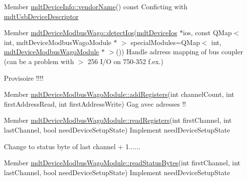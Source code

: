 \begin{DoxyDescription}
\item[Member \hyperlink{classmdt_device_info_a207d7b6b49fd65726232e95cd9e0568c}{mdtDeviceInfo::vendorName}() const  ]Conficting with \hyperlink{classmdt_usb_device_descriptor}{mdtUsbDeviceDescriptor} 
\end{DoxyDescription}

\label{todo__todo000006}
\hypertarget{todo__todo000006}{}
 
\begin{DoxyDescription}
\item[Member \hyperlink{classmdt_device_modbus_wago_af26af790e502e5b85498540dd215cff7}{mdtDeviceModbusWago::detectIos}(\hyperlink{classmdt_device_ios}{mdtDeviceIos} $\ast$ios, const QMap$<$ int, mdtDeviceModbusWagoModule $\ast$ $>$ specialModules=QMap$<$ int, \hyperlink{classmdt_device_modbus_wago_module}{mdtDeviceModbusWagoModule} $\ast$ $>$()) ]Handle adrress mapping of bus coupler (can be a problem with $>$ 256 I/O on 750-\/352 f.ex.) 

Provisoire !!!! 
\end{DoxyDescription}

\label{todo__todo000009}
\hypertarget{todo__todo000009}{}
 
\begin{DoxyDescription}
\item[Member \hyperlink{classmdt_device_modbus_wago_module_ad803f3aa8d9777feaa5cdb3a4cccd316}{mdtDeviceModbusWagoModule::addRegisters}(int channelCount, int firstAddressRead, int firstAddressWrite) ]Gag avec adresses !! 
\end{DoxyDescription}

\label{todo__todo000010}
\hypertarget{todo__todo000010}{}
 
\begin{DoxyDescription}
\item[Member \hyperlink{classmdt_device_modbus_wago_module_aa775cffab72f7ed7cd92a48d26da3225}{mdtDeviceModbusWagoModule::readRegisters}(int firstChannel, int lastChannel, bool needDeviceSetupState) ]Implement needDeviceSetupState 

Change to status byte of last channel + 1...... 
\end{DoxyDescription}

\label{todo__todo000013}
\hypertarget{todo__todo000013}{}
 
\begin{DoxyDescription}
\item[Member \hyperlink{classmdt_device_modbus_wago_module_a90bd4625c8b1efcd34cd56b31dc2f72c}{mdtDeviceModbusWagoModule::readStatusBytes}(int firstChannel, int lastChannel, bool needDeviceSetupState) ]Implement needDeviceSetupState 
\end{DoxyDescription}

